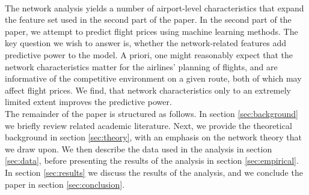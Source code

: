 \medskip \\
The network analysis yields a number of airport-level characteristics that expand the feature set used in the second part of the paper. In the second part of the paper, we attempt to predict flight prices using machine learning methods. The key question we wish to answer is, whether the network-related features add predictive power to the model. A priori, one might reasonably expect that the network characteristics matter for the airlines' planning of flights, and are informative of the competitive environment on a given route, both of which may affect flight prices. We find, that network characteristics only to an extremely limited extent improves the predictive power. 
\medskip \\
The remainder of the paper is structured as follows. In section \ref{sec:background} we briefly review related academic literature. Next, we provide the theoretical background in section \ref{sec:theory}, with an emphasis on the network theory that we draw upon. We then describe the data used in the analysis in section \ref{sec:data}, before presenting the results of the analysis in section \ref{sec:empirical}. In section \ref{sec:results} we discuss the results of the analysis, and we conclude the paper in section \ref{sec:conclusion}.
